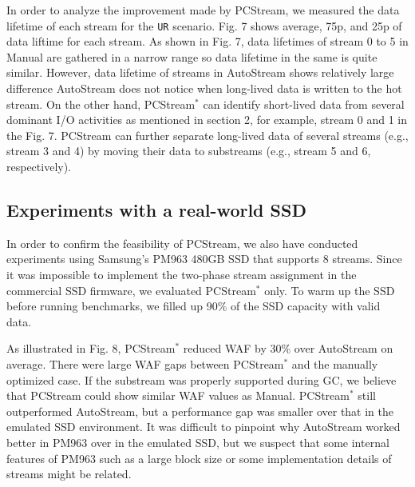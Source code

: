 In order to analyze the improvement made by {\sf PCStream}, 
we measured the data lifetime of each stream for the {\tt UR} scenario.
Fig. 7 shows average, 75p, and 25p of data liftime 
for each stream.
As shown in Fig. 7, data lifetimes of stream 0 to 5
in \textsf{Manual} are gathered in a narrow range so data lifetime in
the same is quite similar.
However, data lifetime of streams in \textsf{AutoStream} shows relatively large difference
\textsf{AutoStream} does not notice when long-lived data is written to
the hot stream.
On the other hand, {\sf PCStream$^*$} can identify short-lived data from 
several dominant I/O activities as mentioned 
in section 2, for example, stream 0 and 1 in the Fig. 7.
\textsf{PCStream} can further separate long-lived data of several streams 
(e.g., stream 3 and 4)
by moving their data to substreams (e.g., stream 5 and 6, respectively). 

\vspace{-10pt}
\subsection{Experiments with a real-world SSD}


In order to confirm the feasibility of \textsf{PCStream}, we also have
conducted experiments using Samsung's PM963 480GB SSD that supports 8 streams.
Since it was impossible to implement the two-phase stream assignment in the
commercial SSD firmware, we evaluated {\sf PCStream$^*$} only.  To warm up the
SSD before running benchmarks, we filled up 90\% of the SSD capacity with valid
data.

As illustrated in Fig. 8, {\sf PCStream$^*$} reduced WAF by
30\% over \textsf{AutoStream} on average.  There were large WAF gaps between
\textsf{PCStream$^{*}$} and the manually optimized case.  If the substream was
properly supported during GC, we believe that \textsf{PCStream} could show
similar WAF values as \textsf{Manual}.  \textsf{PCStream$^*$} still
outperformed \textsf{AutoStream}, but a performance gap was smaller over that
in the emulated SSD environment.  It was difficult to pinpoint why
\textsf{AutoStream} worked better in PM963 over in the emulated SSD, but we
suspect that some internal features of PM963 such as a large block size or some
implementation details of streams might be related. 

